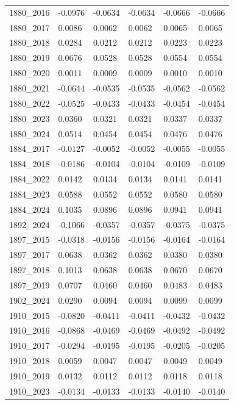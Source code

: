 \begin{table}[htbp]
\begin{tabular}{llllll}
1880_2016 & -0.0976 & -0.0634 & -0.0634 & -0.0666 & -0.0666 \\
1880_2017 & 0.0086 & 0.0062 & 0.0062 & 0.0065 & 0.0065 \\
1880_2018 & 0.0284 & 0.0212 & 0.0212 & 0.0223 & 0.0223 \\
1880_2019 & 0.0676 & 0.0528 & 0.0528 & 0.0554 & 0.0554 \\
1880_2020 & 0.0011 & 0.0009 & 0.0009 & 0.0010 & 0.0010 \\
1880_2021 & -0.0644 & -0.0535 & -0.0535 & -0.0562 & -0.0562 \\
1880_2022 & -0.0525 & -0.0433 & -0.0433 & -0.0454 & -0.0454 \\
1880_2023 & 0.0360 & 0.0321 & 0.0321 & 0.0337 & 0.0337 \\
1880_2024 & 0.0514 & 0.0454 & 0.0454 & 0.0476 & 0.0476 \\
1884_2017 & -0.0127 & -0.0052 & -0.0052 & -0.0055 & -0.0055 \\
1884_2018 & -0.0186 & -0.0104 & -0.0104 & -0.0109 & -0.0109 \\
1884_2022 & 0.0142 & 0.0134 & 0.0134 & 0.0141 & 0.0141 \\
1884_2023 & 0.0588 & 0.0552 & 0.0552 & 0.0580 & 0.0580 \\
1884_2024 & 0.1035 & 0.0896 & 0.0896 & 0.0941 & 0.0941 \\
1892_2024 & -0.1066 & -0.0357 & -0.0357 & -0.0375 & -0.0375 \\
1897_2015 & -0.0318 & -0.0156 & -0.0156 & -0.0164 & -0.0164 \\
1897_2017 & 0.0638 & 0.0362 & 0.0362 & 0.0380 & 0.0380 \\
1897_2018 & 0.1013 & 0.0638 & 0.0638 & 0.0670 & 0.0670 \\
1897_2019 & 0.0707 & 0.0460 & 0.0460 & 0.0483 & 0.0483 \\
1902_2024 & 0.0290 & 0.0094 & 0.0094 & 0.0099 & 0.0099 \\
1910_2015 & -0.0820 & -0.0411 & -0.0411 & -0.0432 & -0.0432 \\
1910_2016 & -0.0868 & -0.0469 & -0.0469 & -0.0492 & -0.0492 \\
1910_2017 & -0.0294 & -0.0195 & -0.0195 & -0.0205 & -0.0205 \\
1910_2018 & 0.0059 & 0.0047 & 0.0047 & 0.0049 & 0.0049 \\
1910_2019 & 0.0132 & 0.0112 & 0.0112 & 0.0118 & 0.0118 \\
1910_2023 & -0.0134 & -0.0133 & -0.0133 & -0.0140 & -0.0140 \\

\end{tabular}
\end{table}
